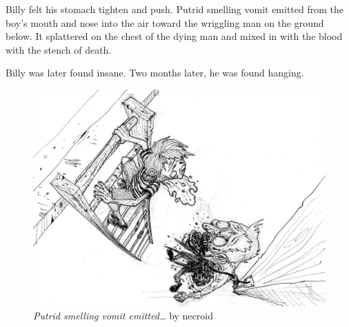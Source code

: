 Billy felt his stomach tighten and push. Putrid smelling vomit emitted
from the boy's mouth and nose into the air toward the wriggling man on
the ground below. It splattered on the chest of the dying man and mixed
in with the blood with the stench of death.

Billy was later found insane. Two months later, he was found hanging.

\begin{figure}[b]
  \includegraphics[width=\textwidth]{art/necroid-putrid_smelling_vomit.jpg}
  \caption{{\em Putrid smelling vomit emitted\ldots} by necroid}
\end{figure}
